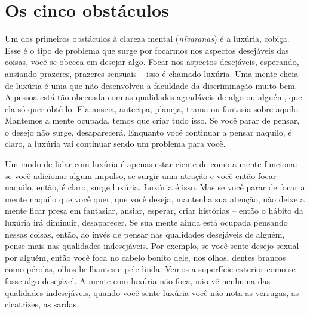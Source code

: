 
\chapter{Os cinco obstáculos}
\markright{\theChapterAuthor}

Um dos primeiros obstáculos à clareza mental (\emph{nīvaranas})
é a luxúria, cobiça. Esse é o tipo de problema que surge por focarmos
nos aspectos desejáveis das coisas, você se obceca em desejar algo.
Focar nos aspectos desejáveis, esperando, ansiando prazeres, prazeres
sensuais – isso é chamado luxúria. Uma mente cheia de luxúria é uma que
não desenvolveu a faculdade da discriminação muito bem. A pessoa está
tão obcecada com as qualidades agradáveis de algo ou alguém, que ela só
quer obtê-lo. Ela anseia, antecipa, planeja, trama ou fantasia sobre
aquilo. Mantemos a mente ocupada, temos que criar tudo isso. Se você
parar de pensar, o desejo não surge, desaparecerá. Enquanto você
continuar a pensar naquilo, é claro, a luxúria vai continuar sendo um
problema para você. 

Um modo de lidar com luxúria é apenas estar ciente de como a mente
funciona: se você adicionar algum impulso, se surgir uma atração e você
então focar naquilo, então, é claro, surge luxúria. Luxúria é isso. Mas
se você parar de focar a mente naquilo que você quer, que você deseja,
mantenha sua atenção, não deixe a mente ficar presa em fantasiar,
ansiar, esperar, criar histórias – então o hábito da luxúria irá
diminuir, desaparecer. Se sua mente ainda está ocupada pensando nessas
coisas, então, ao invés de pensar nas qualidades desejáveis de alguém,
pense mais nas qualidades indesejáveis. Por exemplo, se você sente
desejo sexual por alguém, então você foca no cabelo bonito dele, nos
olhos, dentes brancos como pérolas, olhos brilhantes e pele linda.
Vemos a superfície exterior como se fosse algo desejável. A mente com
luxúria não foca, não vê nenhuma das qualidades indesejáveis, quando
você sente luxúria você não nota as verrugas, as cicatrizes, as sardas.


